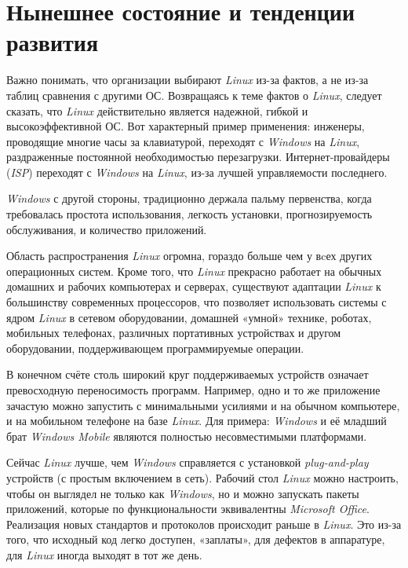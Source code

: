 \section{Нынешнее состояние и тенденции развития}

Важно понимать, что организации выбирают \textit{Linux} из-за фактов, а не из-за таблиц сравнения с другими ОС. Возвращаясь к теме фактов о \textit{Linux}, следует сказать, что \textit{Linux} действительно является надежной, гибкой и высокоэффективной ОС. Вот характерный пример применения: инженеры, проводящие многие часы за клавиатурой, переходят с \textit{Windows} на \textit{Linux}, раздраженные постоянной необходимостью перезагрузки. Интернет-провайдеры (\textit{ISP}) переходят с \textit{Windows} на \textit{Linux}, из-за лучшей управляемости последнего.

\textit{Windows} с другой стороны, традиционно держала пальму первенства, когда требовалась простота использования, легкость установки, прогнозируемость обслуживания, и количество приложений.

Область распространения \textit{Linux} огромна, гораздо больше чем у вcех других операционных систем. Кроме того, что \textit{Linux} прекрасно работает на обычных домашних и рабочих компьютерах и серверах, существуют адаптации \textit{Linux} к большинству современных процессоров, что позволяет использовать системы с ядром \textit{Linux} в сетевом оборудовании, домашней «умной» технике, роботах, мобильных телефонах, различных портативных устройствах и другом оборудовании, поддерживающем программируемые операции.

В конечном счёте столь широкий круг поддерживаемых устройств означает превосходную переносимость программ. Например, одно и то же приложение зачастую можно запустить с минимальными усилиями и на обычном компьютере, и на мобильном телефоне на базе \textit{Linux}. Для примера: \textit{Windows} и её младший брат \textit{Windows Mobile} являются полностью несовместимыми платформами.

Сейчас \textit{Linux} лучше, чем \textit{Windows} справляется с установкой \textit{plug-and-play} устройств (с простым включением в сеть). Рабочий стол \textit{Linux} можно настроить, чтобы он выглядел не только как \textit{Windows}, но и можно запускать пакеты приложений, которые по функциональности эквивалентны \textit{Microsoft Office}. Реализация новых стандартов и протоколов происходит раньше в \textit{Linux}. Это из-за того, что исходный код легко доступен, «заплаты», для дефектов в аппаратуре, для \textit{Linux} иногда выходят в тот же день.

